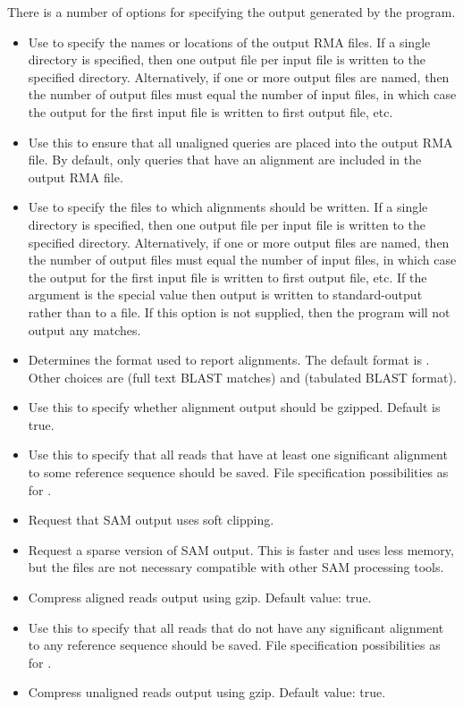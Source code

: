 \documentclass[11pt]{article}
\begin{document}
There is a number of options for specifying the output generated by the program.
\begin{itemize}
\setlength{\itemindent}{30pt}
\item[\itt{--output}]   Use to specify the names or locations of the output RMA files.
	If a single directory is specified, then one output file
per input file is written to the specified directory. Alternatively, if one or more output files are named, then
the number of output files must equal the number of input files, in which case the output for the first
input file is written to first output file, etc. 
\item[\itt{--includeUnaligned}] Use this to ensure that all unaligned queries are placed into the output RMA file. By default, only
queries that have an alignment are included in the output RMA file.
\item[\itt{--alignments}]   Use to specify the files to which alignments should be written.
	If a single directory is specified, then one output file
per input file is written to the specified directory. Alternatively, if one or more output files are named, then
the number of output files must equal the number of input files, in which case the output for the first
input file is written to first output file, etc. If the argument is the special value  then output is written
to standard-output rather than to a file. If this option is not supplied, then the program will not output any matches.
\item[\itt{--format}]  Determines the format used to report alignments. The default format is .
	Other choices are  (full text BLAST matches) and  (tabulated BLAST format).
\item[\itt{--gzipOutput}]   Use this to specify whether alignment output should be gzipped. Default is true.
\item[\itt{--outAligned}]        Use this to specify that all reads that have at least one significant alignment to some reference
sequence should be saved. 
File specification possibilities as for .
\item[\itt{--samSoftClip}] Request that SAM output uses soft clipping.
\item[\itt{--sparseSAM}] Request a sparse version of SAM output. This is faster and uses less memory, but the files are not necessary compatible with
other SAM processing tools.
\item[\itt{--gzipAligned}]                    Compress aligned reads output using gzip. Default value: true.
\item[\itt{--outUnaligned}]      Use this to specify that all reads that do not have any significant alignment to any reference
sequence should be saved.
File specification possibilities as for .
\item[\itt{ --gzipUnaligned}]                  Compress unaligned reads output using gzip. Default value: true.
\end{itemize}
\end{document}
